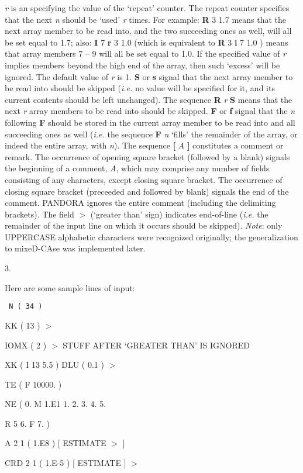 {\it r} is an {\intg} specifying the value of the `repeat' counter. The repeat
\break counter specifies that the next {\it n} should be `used' {\it r} times.
For example:  {\bf R} 3 1.7  means that the next array member to be read into,
and the two succeeding ones as well, will all be set equal to 1.7; also:
{\bf I} 7 {\bf r} 3 1.0  (which is equivalent to  {\bf R} 3 {\bf i} 7 1.0 )
means that array members 7 -- 9 will all be set equal to 1.0. If the specified
value of {\it r} implies members beyond the high end of the array, then
such `excess' will be ignored. The default value of {\it r} is 1.
\ej
{\bf S} or {\bf s} signal that the next array member to be read into should be skipped
\break ({\it i.e.} no value will be specified for it, and its current contents
should be left \break unchanged). The sequence  {\bf R} {\it r} {\bf S}
means that the next {\it r} array members to be read into should be skipped.
\blankline
{\bf F} or {\bf f} signal that the {\it n} following {\bf F} should be stored in the
current array member to be read into and all succeeding ones as well
({\it i.e.} the sequence  {\bf F} {\it n}  `fills' the remainder of the array,
or indeed the entire array, with {\it n}).
\blankline
The sequence  {\bf [} {\it A} {\bf ]}  constitutes a comment or remark.
The occurrence of
opening square bracket (followed by a blank) signals the beginning of a
comment, {\it A}, which may comprise any number of fields consisting of any
characters, except closing square bracket. The occurrence of closing square
bracket (preceeded and followed by blank) signals the end of the comment.
PANDORA ignores the entire comment (including the delimiting brackets).
\blankline
The field  $ > $ (`greater than' sign) indicates end-of-line ({\it i.e.} 
the remainder of the input line on which it occurs should be skipped).
\blankline
{\it Note}: only UPPERCASE alphabetic characters were recognized originally;
the generalization to mixeD-CAse was implemented later.
\ej
\centerline{3. }
\blankline
\blankline
Here are some sample lines of input:
\blankline
\blankline
\blankline
\blankline
{\tt
{} \qquad N ( 34 ) \par
{} \qquad KK ( 13 ) $>$ \par
{} \qquad IOMX ( 2 ) $>$  STUFF AFTER `GREATER THAN' 
IS IGNORED \par
{}  \par
{} \qquad XK ( I 13 5.5 )  DLU  ( 0.1 )  $>$ \par
{} \qquad TE ( F 10000. ) \par
{} \qquad NE ( 0. M 1.E1 1. 2. 3. 4. 5. \par
{} \qquad R 5 6. F 7. ) \par
{}   \par
{}   \par
{} \qquad A 2 1 ( 1.E8 )  [ ESTIMATE $>$ ]  \par
{} \qquad CRD 2 1 ( 1.E-5 )  [ ESTIMATE ] $>$ \par
}
